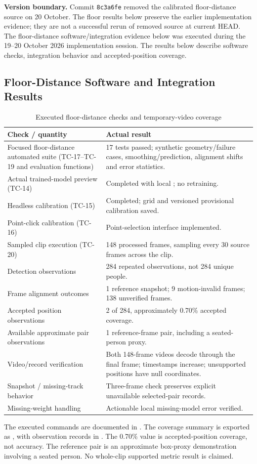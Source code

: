 \textbf{Version boundary.} Commit \texttt{8c3a6fe} removed the calibrated floor-distance source on 20 October. The floor results below preserve the earlier implementation evidence; they are not a successful rerun of removed source at current HEAD. The floor-distance software/integration evidence below was executed during the 19--20 October 2026 implementation session. The results below describe software checks, integration behavior and accepted-position coverage.

\subsection{Floor-Distance Software and Integration Results}
\begin{longtable}{P{0.42\textwidth}P{0.44\textwidth}}
\caption{Executed floor-distance checks and temporary-video coverage}\label{tab:floor-results}\\
\toprule
Check / quantity & Actual result\\
\midrule
\endhead
Focused floor-distance automated suite (TC-17--TC-19 and evaluation functions) & 17 tests passed; synthetic geometry/failure cases, smoothing/prediction, alignment shifts and error statistics.\\
Actual trained-model preview (TC-14) & Completed with local ; no retraining.\\
Headless calibration (TC-15) & Completed; grid and versioned provisional calibration saved.\\
Point-click calibration (TC-16) & Point-selection interface implemented.\\
Sampled clip execution (TC-20) & 148 processed frames, sampling every 30 source frames across the clip.\\
Detection observations & 284 repeated observations, not 284 unique people.\\
Frame alignment outcomes & 1 reference snapshot; 9 motion-invalid frames; 138 unverified frames.\\
Accepted position observations & 2 of 284, approximately 0.70\% accepted coverage.\\
Available approximate pair observations & 1 reference-frame pair, including a seated-person proxy.\\
Video/record verification & Both 148-frame videos decode through the final frame; timestamps increase; unsupported positions have null coordinates.\\
Snapshot / missing-track behavior & Three-frame check preserves explicit unavailable selected-pair records.\\
Missing-weight handling & Actionable local missing-model error verified.\\
\bottomrule
\end{longtable}
The executed commands are documented in . The coverage summary is exported as , with observation records in . The 0.70\% value is accepted-position coverage, not accuracy. The reference pair is an approximate box-proxy demonstration involving a seated person. No whole-clip supported metric result is claimed.

